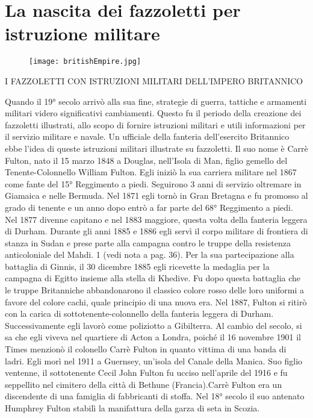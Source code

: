 \chapter[]{La nascita dei fazzoletti per istruzione militare}
\graphicspath{ {./images/chapter1/} }

\begin{figure}[h]
	\centering
		\texttt{[image: britishEmpire.jpg]}
	\caption{}
	\label{fig:britishEmpire}
\end{figure}

\newpage

I FAZZOLETTI CON ISTRUZIONI MILITARI 
    DELL’IMPERO BRITANNICO

   Quando il 19° secolo arrivò alla sua fine, strategie di guerra, tattiche e armamenti militari videro significativi cambiamenti. Questo fu il periodo della creazione dei fazzoletti illustrati,  allo scopo di fornire istruzioni militari e utili informazioni per il servizio militare e navale.
   Un ufficiale della fanteria dell’esercito Britannico ebbe l’idea di queste istruzioni militari illustrate su fazzoletti. Il suo nome è Carrè Fulton, nato il 15 marzo 1848 a Douglas, nell’Isola di Man, figlio gemello del Tenente-Colonnello William Fulton. Egli iniziò la sua carriera militare nel 1867 come fante del 15° Reggimento a piedi. Seguirono 3 anni di servizio oltremare in Giamaica e nelle Bermuda. Nel 1871 egli tornò in Gran Bretagna e fu promosso al grado di tenente e un anno dopo entrò a far parte del 68° Reggimento a piedi. Nel 1877 divenne capitano e nel 1883 maggiore, questa volta della fanteria leggera di Durham. Durante gli anni 1885 e 1886 egli servì  il corpo militare di frontiera di stanza in Sudan  e prese parte alla campagna contro le truppe della resistenza anticoloniale del Mahdi. 1 (vedi nota a pag. 36).
  Per la sua partecipazione alla battaglia di Ginnis, il 30 dicembre 1885 egli ricevette la medaglia per la campagna di Egitto insieme alla stella di Khedive. 
Fu dopo questa battaglia che le truppe Britanniche abbandonarono il classico colore rosso delle loro uniformi a favore del colore cachi, quale principio di una nuova era.
   Nel 1887, Fulton si ritirò con la carica di sottotenente-colonnello della fanteria leggera di  Durham.  Successivamente egli lavorò come poliziotto a Gibilterra. Al cambio del secolo, si sa che egli viveva nel quartiere di Acton a Londra, poiché il 16 novembre 1901 il Times menzionò il colonello Carrè Fulton in quanto vittima di una banda di ladri. Egli morì nel 1911 a Guernsey, un’isola del Canale della Manica. Suo figlio ventenne, il sottotenente Cecil John Fulton fu ucciso nell’aprile del 1916 e fu seppellito nel cimitero della città di Bethune (Francia).Carrè Fulton era un discendente di una famiglia di fabbricanti di stoffa. Nel 18° secolo il suo antenato Humphrey Fulton stabilì la manifattura della garza di seta in Scozia.

